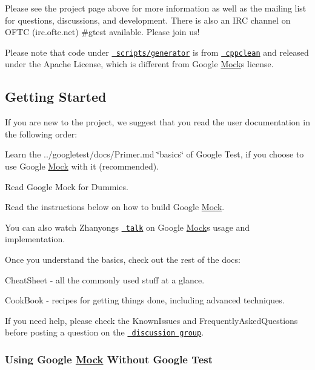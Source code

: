 Please see the project page above for more information as well as the mailing list for questions, discussions, and development. There is also an I\+RC channel on O\+F\+TC (irc.\+oftc.\+net) \#gtest available. Please join us!

Please note that code under \href{scripts/generator/}\texttt{ scripts/generator} is from \href{http://code.google.com/p/cppclean/}\texttt{ cppclean} and released under the Apache License, which is different from Google \mbox{\hyperlink{class_mock}{Mock}}\textquotesingle{}s license.

\subsection*{Getting Started}

If you are new to the project, we suggest that you read the user documentation in the following order\+:


\begin{DoxyItemize}
\item Learn the ../googletest/docs/\+Primer.md \char`\"{}basics\char`\"{} of Google Test, if you choose to use Google \mbox{\hyperlink{class_mock}{Mock}} with it (recommended).
\item Read Google Mock for Dummies.
\item Read the instructions below on how to build Google \mbox{\hyperlink{class_mock}{Mock}}.
\end{DoxyItemize}

You can also watch Zhanyong\textquotesingle{}s \href{http://www.youtube.com/watch?v=sYpCyLI47rM}\texttt{ talk} on Google \mbox{\hyperlink{class_mock}{Mock}}\textquotesingle{}s usage and implementation.

Once you understand the basics, check out the rest of the docs\+:


\begin{DoxyItemize}
\item Cheat\+Sheet -\/ all the commonly used stuff at a glance.
\item Cook\+Book -\/ recipes for getting things done, including advanced techniques.
\end{DoxyItemize}

If you need help, please check the Known\+Issues and Frequently\+Asked\+Questions before posting a question on the \href{http://groups.google.com/group/googlemock}\texttt{ discussion group}.

\subsubsection*{Using Google \mbox{\hyperlink{class_mock}{Mock}} Without Google Test}

